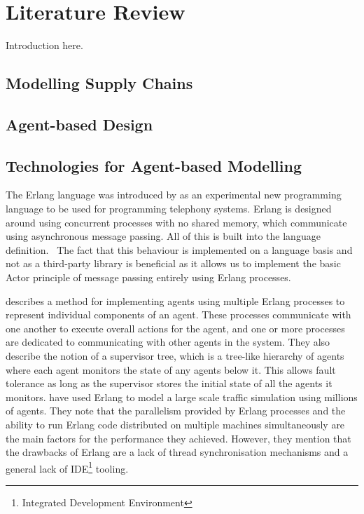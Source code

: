 \section{Literature Review}

Introduction here.

\subsection{Modelling Supply Chains}

\subsection{Agent-based Design}

\subsection{Technologies for Agent-based Modelling}

The Erlang language was introduced by  as an experimental new programming language to be used for programming telephony systems.
Erlang is designed around using concurrent processes with no shared memory, which communicate using asynchronous message passing.
All of this is built into the language definition.~\cite{armstrong2007history}
The fact that this behaviour is implemented on a language basis and not as a third-party library is beneficial as it allows us to implement the basic Actor principle of message passing entirely using Erlang processes.

 describes a method for implementing agents using multiple Erlang processes to represent individual components of an agent.
These processes communicate with one another to execute overall actions for the agent, and one or more processes are dedicated to communicating with other agents in the system.
They also describe the notion of a supervisor tree, which is a tree-like hierarchy of agents where each agent monitors the state of any agents below it.
This allows fault tolerance as long as the supervisor stores the initial state of all the agents it monitors.
 have used Erlang to model a large scale traffic simulation using millions of agents.
They note that the parallelism provided by Erlang processes and the ability to run Erlang code distributed on multiple machines simultaneously are the main factors for the performance they achieved.
However, they mention that the drawbacks of Erlang are a lack of thread synchronisation mechanisms and a general lack of IDE\footnote{Integrated Development Environment} tooling.
